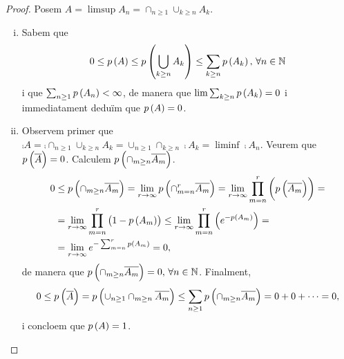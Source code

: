 \begin{proof}
    Posem $A=\limsup A_n=\cap_{n\geq 1}\cup_{k\geq n} A_k$.
    \begin{enumerate}[i)]
        \item Sabem que
            \[
                0\leq p\left( A\right)\leq p\left(\bigcup_{k\geq n}A_k\right)\leq\sum_{k\geq n} p\left( A_k\right) ,\,\forall n\in\mathbb{N}
            \]
            i que $\sum_{n\geq 1} p\left( A_n\right)<\infty$, de manera que $\lim \sum_{k\geq n} p\left( A_k\right)=0$ i immediatament deduïm que $p\left( A\right)=0$.
        \item Observem primer que $\comp{A}=\comp{\cap_{n\geq 1}\cup_{k\geq n} A_k}=\cup_{n\geq 1}\cap_{k\geq n} \comp{A_k}=\liminf\comp{A_n}$. Veurem que $p\left( \overline{A}\right)=0$. Calculem $p\left( \cap_{m\geq n} \overline{A_m}\right)$.
        \begin{align*}
            0&\leq p\left( \cap_{m\geq n} \overline{A_m}\right) = \lim_{r\to\infty} p\left( \cap_{m= n}^r \overline{A_m}\right) = \lim_{r\to\infty} \prod_{m= n}^r \left( p\left(\overline{A_m}\right)\right) =\\
            &= \lim_{r\to\infty} \prod_{m= n}^r \left( 1-p\left( A_m\right)\right) \leq \lim_{r\to\infty} \prod_{m= n}^r \left( e^{-p\left( A_m\right)}\right) =\\
            &=\lim_{r\to\infty} e^{-\sum_{m= n}^r p\left( A_m\right)} = 0,
        \end{align*}
        de manera que $p\left( \cap_{m\geq n} \overline{A_m}\right)=0, \,\forall n\in\mathbb{N}$.
        Finalment,
        \[
            0\leq p\left(\overline{A}\right)=p\left(\cup_{n\geq 1}\cap_{m\geq n} \overline{A_m}\right)\leq\sum_{n\geq 1}p\left(\cap_{m\geq n} \overline{A_m}\right)=0+0+\cdots=0,
        \]
        i concloem que $p\left( A\right)=1$.
    \end{enumerate}
\end{proof}
